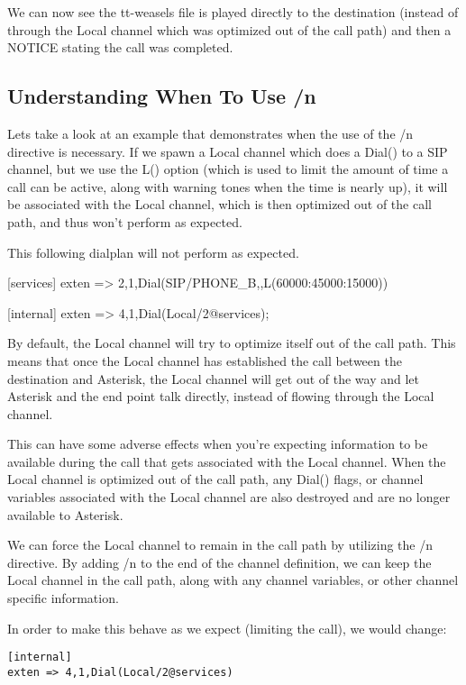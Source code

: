 We can now see the tt-weasels file is played directly to the destination
(instead of through the Local channel which was optimized out of the call path)
and then a NOTICE stating the call was completed.

\subsection{Understanding When To Use /n}

Lets take a look at an example that demonstrates when the use of the /n
directive is necessary. If we spawn a Local channel which does a Dial()
to a SIP channel, but we use the L() option (which is used to limit the
amount of time a call can be active, along with warning tones when the
time is nearly up), it will be associated with the Local channel,
which is then optimized out of the call path, and thus won't perform
as expected.

This following dialplan will not perform as expected.

[services]
exten => 2,1,Dial(SIP/PHONE\_B,,L(60000:45000:15000))

[internal]
exten => 4,1,Dial(Local/2@services);

By default, the Local channel will try to optimize itself out of the call path.
This means that once the Local channel has established the call between the
destination and Asterisk, the Local channel will get out of the way and let
Asterisk and the end point talk directly, instead of flowing through the Local
channel.

This can have some adverse effects when you're expecting information to be
available during the call that gets associated with the Local channel. When the
Local channel is optimized out of the call path, any Dial() flags, or channel
variables associated with the Local channel are also destroyed and are no longer
available to Asterisk.

We can force the Local channel to remain in the call path by utilizing the /n
directive. By adding /n to the end of the channel definition, we can keep the
Local channel in the call path, along with any channel variables, or other
channel specific information.

In order to make this behave as we expect (limiting the call), we would change:

\begin{verbatim}
[internal]
exten => 4,1,Dial(Local/2@services)
\end{verbatim}


